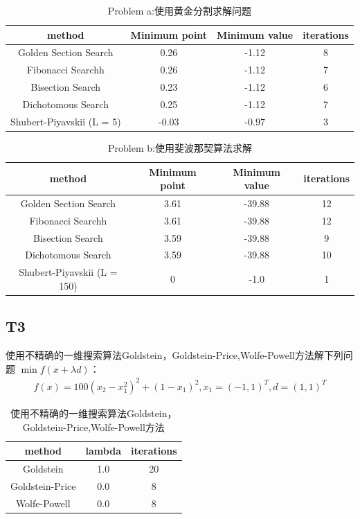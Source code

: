 \documentclass[a4paper]{article}
\begin{document}
    \begin{table}[h!]
    \centering
    \begin{tabular}{cccc}
        \toprule
        method  &  Minimum point & Minimum value & iterations \\
        \midrule
        Golden Section Search & 0.26 & -1.12 & 8 \\
        Fibonacci Searchh & 0.26 & -1.12 & 7 \\
        Bisection Search & 0.23 & -1.12 & 6 \\
        Dichotomous Search & 0.25 & -1.12 & 7 \\
        Shubert-Piyavskii (L = 5) & -0.03 & -0.97 & 3 \\
        \bottomrule
    \end{tabular}
    \caption{Problem a:使用黄金分割求解问题}
    \end{table}


    \begin{table}[h!]
    \centering
    \begin{tabular}{cccc}
        \toprule
        method  &  Minimum point & Minimum value & iterations \\
        \midrule
        Golden Section Search & 3.61 & -39.88 & 12 \\
        Fibonacci Searchh & 3.61 & -39.88 & 12 \\
        Bisection Search & 3.59 & -39.88 & 9 \\
        Dichotomous Search & 3.59 & -39.88 & 10\\
        Shubert-Piyavskii (L = 150) &  0 & -1.0 & 1 \\
        \bottomrule
    \end{tabular}
    \caption{Problem b:使用斐波那契算法求解}
    \end{table}
 

    \subsection*{T3}
    使用不精确的一维搜索算法Goldstein，Goldstein-Price,Wolfe-Powell方法解下列问题 $\min f(x+\lambda d)$：
    \begin{align*}
        f(x) = 100(x_2-x_1^2)^2+(1-x_1)^2, x_1 = (-1,1)^T, d=(1,1)^T 
    \end{align*}

    \begin{table}[h!]
    \centering
    \begin{tabular}{ccc}
        \toprule
        method  &  lambda & iterations\\
        \midrule
        Goldstein & 1.0 & 20\\
        Goldstein-Price & 0.0 & 8\\
        Wolfe-Powell & 0.0 & 8 \\
        \bottomrule
    \end{tabular}
    \caption{使用不精确的一维搜索算法Goldstein，Goldstein-Price,Wolfe-Powell方法}
    \end{table}
\end{document}
